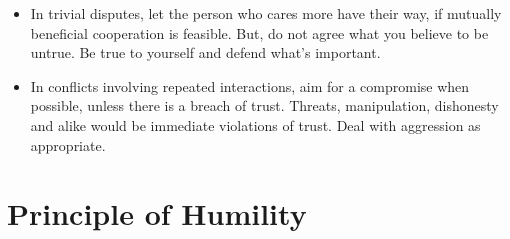 \documentclass[
]{book}
\providecommand{\tightlist}{%
  \setlength{\itemsep}{0pt}\setlength{\parskip}{0pt}}
\begin{document}
\begin{itemize}
  \begin{itemize}
  \tightlist
  \item
    In trivial disputes, let the person who cares more have their way, if mutually beneficial cooperation is feasible. But, do not agree what you believe to be untrue. Be true to yourself and defend what's important.
  \item
    In conflicts involving repeated interactions, aim for a compromise when possible, unless there is a breach of trust. Threats, manipulation, dishonesty and alike would be immediate violations of trust. Deal with aggression as appropriate.
  \end{itemize}
\end{itemize}

\hypertarget{principle-of-humility}{%
\section{Principle of Humility}\label{principle-of-humility}}
\end{document}
